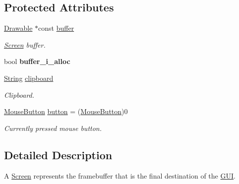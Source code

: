 \subsection*{Protected Attributes}
\begin{DoxyCompactItemize}
\item 
\hypertarget{classGUI_1_1Screen_a30b34167fe1aad767a0f7fcfd617ddfa}{\hyperlink{classGUI_1_1Drawable}{Drawable} $\ast$const \hyperlink{classGUI_1_1Screen_a30b34167fe1aad767a0f7fcfd617ddfa}{buffer}}\label{classGUI_1_1Screen_a30b34167fe1aad767a0f7fcfd617ddfa}

\begin{DoxyCompactList}\small\item\em \hyperlink{classGUI_1_1Screen}{Screen} buffer. \end{DoxyCompactList}\item 
\hypertarget{classGUI_1_1Screen_aea9148e41c5bd314d068f879ed3e199f}{bool {\bfseries buffer\-\_\-i\-\_\-alloc}}\label{classGUI_1_1Screen_aea9148e41c5bd314d068f879ed3e199f}

\item 
\hypertarget{classGUI_1_1Screen_ae1bac72316cf4d07b19c2e4ae497e272}{\hyperlink{classGUI_1_1String}{String} \hyperlink{classGUI_1_1Screen_ae1bac72316cf4d07b19c2e4ae497e272}{clipboard}}\label{classGUI_1_1Screen_ae1bac72316cf4d07b19c2e4ae497e272}

\begin{DoxyCompactList}\small\item\em Clipboard. \end{DoxyCompactList}\item 
\hypertarget{classGUI_1_1Screen_a76597fbd366faf61d3a26f698e82e1f7}{\hyperlink{namespaceGUI_ad06082a7b02aa73697f39eb8e0856de9}{Mouse\-Button} \hyperlink{classGUI_1_1Screen_a76597fbd366faf61d3a26f698e82e1f7}{button} = (\hyperlink{namespaceGUI_ad06082a7b02aa73697f39eb8e0856de9}{Mouse\-Button})0}\label{classGUI_1_1Screen_a76597fbd366faf61d3a26f698e82e1f7}

\begin{DoxyCompactList}\small\item\em Currently pressed mouse button. \end{DoxyCompactList}\end{DoxyCompactItemize}


\subsection{Detailed Description}
A \hyperlink{classGUI_1_1Screen}{Screen} represents the framebuffer that is the final destination of the \hyperlink{namespaceGUI}{G\-U\-I}. 

